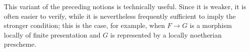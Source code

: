 This variant of the preceding notions is technically useful.  Since
it is weaker, it is often easier to verify, while it is nevertheless
frequently sufficient to imply the stronger condition; this is the
case, for example, when \(F\to G\) is a morphism locally of finite
presentation and \(G\) is represented by a locally noetherian
prescheme.

